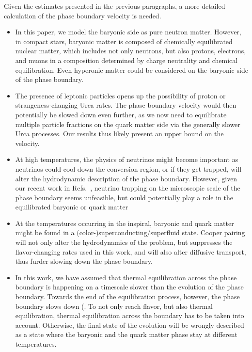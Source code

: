 \documentclass[10pt,superscriptaddress,
amsmath,aps,prc,twocolumn,nofootinbib,floatfix]{revtex4-1}
\newcommand{\AH}[1]{{\color{cyan}#1}}
\newcommand{\AHcom}[1]{\textsf{\color{cyan}{\textsuperscript{AH}#1}}}
\begin{document}
\AH{
Given the estimates presented in the previous paragraphs, a more detailed calculation of the phase boundary velocity is needed.
\begin{itemize}[leftmargin=*]
    \item In this paper, we model the baryonic side as pure neutron matter. However, in compact stars, baryonic matter is composed of chemically equilibrated nuclear matter, which includes not only neutrons, but also protons, electrons, and muons in a composition determined by charge neutrality and chemical equilibration. Even hyperonic matter could be considered on the baryonic side of the phase boundary.
    \item The presence of leptonic particles opens up the possibility of proton or strangeness-changing Urca rates. The phase boundary velocity would then potentially be slowed down even further, as we now need to equilibrate multiple particle fractions on the quark matter side via the generally slower Urca processes. Our results thus likely present an upper bound on the velocity.
    \item At high temperatures, the physics of neutrinos might become important as neutrinos could cool down the conversion region, or if they get trapped, will alter the hydrodynamic description of the phase boundary. However, given our recent work in Refs.~\cite{Alford:2025jtm,Alford:2026kwd}, neutrino trapping on the microscopic scale of the phase boundary seems unfeasible, but could potentially play a role in the equilibrated baryonic or quark matter
    \item At the temperatures occurring in the inspiral, baryonic and quark matter might be found in a (color-)superconducting/superfluid state. Cooper pairing will not only alter the hydrodynamics of the problem, but suppresses the flavor-changing rates used in this work, and will also alter diffusive transport, thus furder slowing down the phase boundary.
    \item In this work, we have assumed that thermal equilibration across the phase boundary is happening on a timescale slower than the evolution of the phase boundary. Towards the end of the equilibration process, however, the phase boundary slows down (\AHcom{do we have a section explaining this?}. To not only reach flavor, but also thermal equilibration, thermal equilibration across the boundary has to be taken into account. Otherwise, the final state of the evolution will be wrongly described as a state where the baryonic and the quark matter phase stay at different temperatures.


\end{itemize}}
\end{document}
